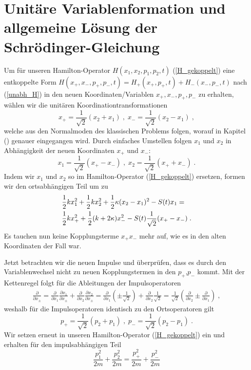 \section{Unitäre Variablenformation und allgemeine Lösung der Schrödinger-Gleichung}
  Um für unseren Hamilton-Operator $H(x_1,x_2,p_1,p_2,t)$ (\ref{H_gekoppelt}) eine entkoppelte Form $H(x_+,x_-,p_+,p_-,t)=H_+(x_+,p_+,t)+H_-(x_-,p_-,t)$ nach (\ref{unabh_H}) in den neuen Koordinaten/Variablen $x_+,x_-,p_+,p_-$ zu erhalten, wählen wir die unitären Koordinationtransformationen \cite{arxiv}
  \begin{equation}
    x_+ = \frac{1}{\sqrt{2}}(x_2+x_1) \;,\; x_-=\frac{1}{\sqrt{2}}(x_2-x_1) \;,
  \end{equation}
  welche aus den Normalmoden des klassischen Problems folgen, worauf in Kapitel () genauer eingegangen wird.
  Durch einfaches Umstellen folgen $x_1$ und $x_2$ in Abhängigkeit der neuen Koordinaten $x_+$ und $x_-$:
  \begin{equation}
    x_1=\frac{1}{\sqrt{2}}(x_+-x_-) \;,\; x_2=\frac{1}{\sqrt{2}}(x_++x_-) \; .
  \end{equation}
  Indem wir $x_1$ und $x_2$ so im Hamilton-Operator (\ref{H_gekoppelt}) ersetzen, formen wir den ortsabhängigen Teil um zu
  \begin{align}
    &\frac{1}{2}kx_1^2+\frac{1}{2}kx_2^2+\frac{1}{2}\kappa(x_2-x_1)^2-S(t)x_1= \notag\\
    &\frac{1}{2}kx_+^2+\frac{1}{2}(k+2\kappa)x_-^2-S(t)\frac{1}{\sqrt{2}}(x_+-x_-) \; .
  \end{align}
  Es tauchen nun keine Kopplungsterme $x_+x_-$ mehr auf, wie es in den alten Koordinaten der Fall war.

  Jetzt betrachten wir die neuen Impulse und überprüfen, dass es durch den Variablenwechsel nicht zu neuen Kopplungstermen in den $p_+$,$p_-$ kommt.
  Mit der Kettenregel folgt für die Ableitungen der Impulsoperatoren
  \begin{align}
    \frac{\partial}{\partial x_{\pm}} = \frac{\partial}{\partial x_1}\frac{\partial x_1}{\partial x_{\pm}} + \frac{\partial}{\partial x_2}\frac{\partial x_2}{\partial x_{\pm}}
    =\frac{\partial}{\partial x_1}\left(\pm\frac{1}{\sqrt{2}}\right)
    + \frac{\partial}{\partial x_2}\frac{1}{\sqrt{2}}
    = \frac{1}{\sqrt{2}}\left(\frac{\partial}{\partial x_2}\pm\frac{\partial}{\partial  x_1}\right) \;,
  \end{align}
  weshalb für die Impulsoperatoren identisch zu den Ortsoperatoren gilt
  \begin{equation}
    p_+ = \frac{1}{\sqrt{2}}(p_2+p_1) \;,\; p_-=\frac{1}{\sqrt{2}}(p_2-p_1) \; .
  \end{equation}
  Wir setzen erneut in unseren Hamilton-Operator (\ref{H_gekoppelt}) ein und erhalten für den impulsabhängigen Teil
  \begin{equation}
    \frac{p_1^2}{2m} + \frac{p_2^2}{2m} = \frac{p_+^2}{2m} + \frac{p_-^2}{2m}
  \end{equation}

